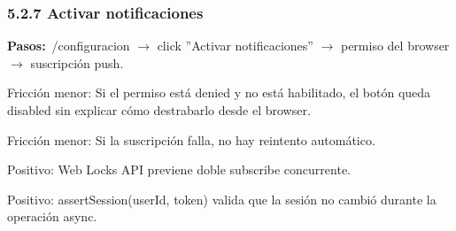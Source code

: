 \documentclass[10pt,a4paper]{article}
\begin{document}
\subsubsection{5.2.7 Activar notificaciones}
\noindent\textbf{Pasos:}\ /configuracion $\rightarrow$ click ''Activar notificaciones'' $\rightarrow$ permiso del browser $\rightarrow$ suscripción push.\par\vspace{0.4em}
Fricción menor: Si el permiso está denied y no está habilitado, el botón queda disabled sin explicar cómo destrabarlo desde el browser.\par\vspace{0.4em}
Fricción menor: Si la suscripción falla, no hay reintento automático.\par\vspace{0.4em}
Positivo: Web Locks API previene doble subscribe concurrente.\par\vspace{0.4em}
Positivo: assertSession(userId, token) valida que la sesión no cambió durante la operación async.\par\vspace{0.4em}
\end{document}

